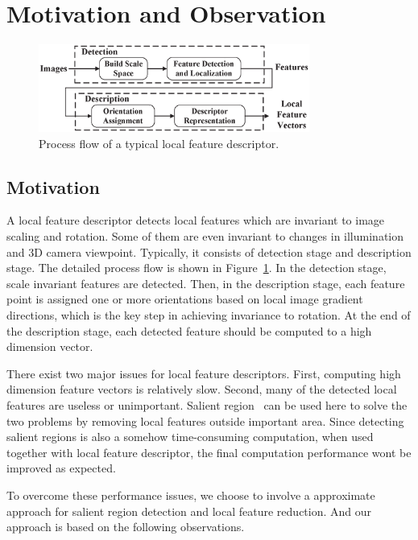 \section{Motivation and Observation}
\label{sec:observation}

\begin{figure}
	\centering
	\includegraphics[width=3.5in]{images/fig-workflow.eps}
	\caption{Process flow of a typical local feature descriptor.}
	\label{fig:workflow}
\end{figure}

\subsection{Motivation}

A local feature descriptor detects local features which are invariant to image scaling and rotation. Some of them are even invariant to changes in illumination and 3D camera viewpoint. Typically, it consists of detection stage and description stage. The detailed process flow is shown in Figure~\ref{fig:workflow}. In the detection stage, scale invariant features are detected. Then, in the description stage, each feature point is assigned one or more orientations based on local image gradient directions, which is the key step in achieving invariance to rotation. At the end of the description stage, each detected feature should be computed to a high dimension vector.

There exist two major issues for local feature descriptors. First, computing high dimension feature vectors is relatively slow. Second, many of the detected local features are useless or unimportant. Salient region~\cite{huang2009image,liang2010salient} can be used here to solve the two problems by removing local features outside important area. Since detecting salient regions is also a somehow time-consuming computation, when used together with local feature descriptor, the final computation performance wont be improved as expected.

To overcome these performance issues, we choose to involve a approximate approach for salient region detection and local feature reduction. And our approach is based on the following observations.

